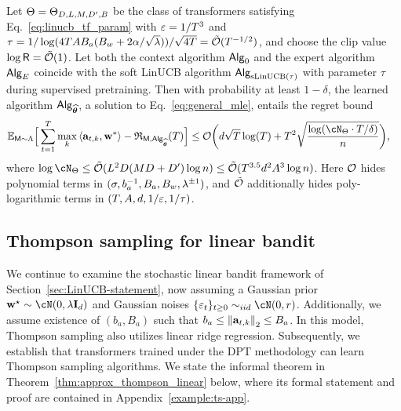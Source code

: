 \begin{theorem}\label{thm:smooth_linucb}
Let $\Theta = \Theta_{D, L, M, {D'}, B}$ be the class of transformers satisfying Eq.~\eqref{eq:linucb_tf_param} with $\varepsilon=1/{T}^3$ and ${\tau} = 1/ \log(4{T}{A} B_a(B_w+2\alpha/\sqrt{\lambda}))/\sqrt{4{T}}={\tilde{\mathcal O}}({T}^{-1/2})$, and choose the clip value $\log{\mathsf{R}} = {\tilde{\mathcal O}}(1)$. Let both the context algorithm ${\mathsf{Alg}}_0$ and the expert algorithm ${\mathsf{Alg}}_{E}$ coincide with the soft LinUCB algorithm ${\mathsf{Alg}}_{{\mathrm{sLinUCB}}(\tau)}$ with parameter $\tau$ during supervised pretraining. Then with probability at least $1-\delta$, the learned algorithm ${\mathsf{Alg}}_{{\widehat{{\boldsymbol \theta}}}}$, a solution to Eq.~\eqref{eq:general_mle}, entails the regret bound
\begin{align*}
\E_{\inst\sim\prior}\Big[\sum_{t=1}^\totlen\max_{k}\<\ba_{t,k},\bw^*\>-\totreward_{\inst,\sAlg_\esttfpar}(\totlen)\Big]&\leq   \cO\bigg( d\sqrt{\totlen}\log(\totlen)+ \totlen^2\sqrt{\frac{\log ( \cN_{\Parspace} \cdot \totlen/\delta )}{n} } \bigg),
\end{align*}
where $\log \cN_{\Parspace} \le \tcO(\layer^2\embd(\head\embd+\hidden) \log\Numobs) \leq \tcO(\totlen^{3.5} d^2 \Numact^3\log\Numobs)$. Here $\mathcal{O}$ hides polynomial terms in $(\sigma, b_a^{-1}, B_a, \\B_w, \lambda^{\pm1})$, and ${\tilde{\mathcal O}}$ additionally hides poly-logarithmic terms in $({T}, {A}, d, 1/\varepsilon,1/{\tau})$.
\end{theorem}



\subsection{Thompson sampling for linear bandit}\label{sec:TS-statement}


We continue to examine the stochastic linear bandit framework of Section~\ref{sec:LinUCB-statement}, now assuming a Gaussian prior $\bw^\star\sim \cN(0,\Tpspar\id_d)$ and Gaussian noises $\{ \eps_t \}_{t \ge 0} \sim_{iid} \cN(0,\Tpsparn)$. Additionally, we assume existence of $(b_a, B_a)$ such that $b_a\leq\left\|{{\mathbf a}_{t,k}}\right\|_2\leq B_a$. In this model, Thompson sampling also utilizes linear ridge regression. Subsequently, we establish that transformers trained under the DPT methodology can learn Thompson sampling algorithms. We state the informal theorem in Theorem~\ref{thm:approx_thompson_linear} below, where its formal statement and proof are contained in Appendix~\ref{example:ts-app}.


